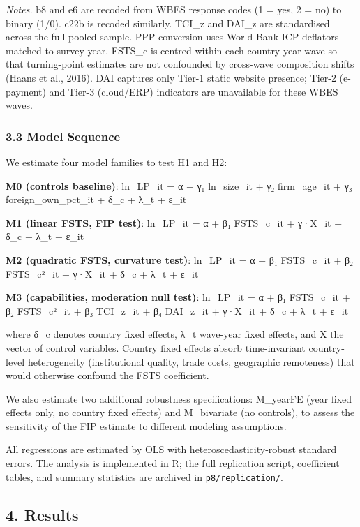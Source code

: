 \documentclass[
  12pt,a4paper]{article}
\begin{document}
\emph{Notes.} b8 and e6 are recoded from WBES response codes (1 = yes, 2
= no) to binary (1/0). c22b is recoded similarly. TCI\_z and DAI\_z are
standardised across the full pooled sample. PPP conversion uses World
Bank ICP deflators matched to survey year. FSTS\_c is centred within
each country-year wave so that turning-point estimates are not
confounded by cross-wave composition shifts (Haans et al., 2016). DAI
captures only Tier-1 static website presence; Tier-2 (e-payment) and
Tier-3 (cloud/ERP) indicators are unavailable for these WBES waves.

\hypertarget{model-sequence}{%
\subsubsection{3.3 Model Sequence}\label{model-sequence}}

We estimate four model families to test H1 and H2:

\textbf{M0 (controls baseline)}: ln\_LP\_it = α + γ₁ ln\_size\_it + γ₂
firm\_age\_it + γ₃ foreign\_own\_pct\_it + δ\_c + λ\_t + ε\_it

\textbf{M1 (linear FSTS, FIP test)}: ln\_LP\_it = α + β₁ FSTS\_c\_it +
γ·X\_it + δ\_c + λ\_t + ε\_it

\textbf{M2 (quadratic FSTS, curvature test)}: ln\_LP\_it = α + β₁
FSTS\_c\_it + β₂ FSTS\_c²\_it + γ·X\_it + δ\_c + λ\_t + ε\_it

\textbf{M3 (capabilities, moderation null test)}: ln\_LP\_it = α + β₁
FSTS\_c\_it + β₂ FSTS\_c²\_it + β₃ TCI\_z\_it + β₄ DAI\_z\_it + γ·X\_it
+ δ\_c + λ\_t + ε\_it

where δ\_c denotes country fixed effects, λ\_t wave-year fixed effects,
and X the vector of control variables. Country fixed effects absorb
time-invariant country-level heterogeneity (institutional quality, trade
costs, geographic remoteness) that would otherwise confound the FSTS
coefficient.

We also estimate two additional robustness specifications: M\_yearFE
(year fixed effects only, no country fixed effects) and M\_bivariate (no
controls), to assess the sensitivity of the FIP estimate to different
modeling assumptions.

All regressions are estimated by OLS with heteroscedasticity-robust
standard errors. The analysis is implemented in R; the full replication
script, coefficient tables, and summary statistics are archived in
\texttt{p8/replication/}.

\hypertarget{results}{%
\subsection{4. Results}\label{results}}
\end{document}
